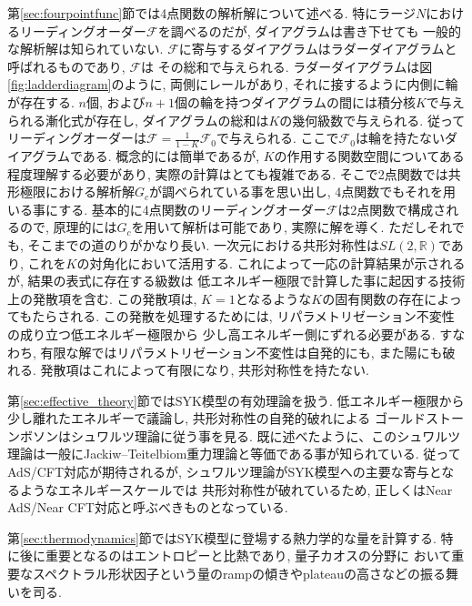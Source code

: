 第\ref{sec:fourpointfunc}節では4点関数の解析解について述べる. 
特にラージ$N$におけるリーディングオーダー$\mathcal{F}$を調べるのだが, ダイアグラムは書き下せても
一般的な解析解は知られていない. 
$\mathcal{F}$に寄与するダイアグラムはラダーダイアグラムと呼ばれるものであり, $\mathcal{F}$は
その総和で与えられる. 
ラダーダイアグラムは図\ref{fig:ladderdiagram}のように, 両側にレールがあり, 
それに接するように内側に輪が存在する. 
$n$個, および$n+1$個の輪を持つダイアグラムの間には積分核$K$で与えられる漸化式が存在し, 
ダイアグラムの総和は$K$の幾何級数で与えられる. 
従ってリーディングオーダーは$\mathcal{F} = \frac{1}{1-K}\mathcal{F}_0$で与えられる. 
ここで$\mathcal{F}_0$は輪を持たないダイアグラムである. 
概念的には簡単であるが, $K$の作用する関数空間についてある程度理解する必要があり, 
実際の計算はとても複雑である. 
そこで2点関数では共形極限における解析解$G_c$が調べられている事を思い出し, 
4点関数でもそれを用いる事にする. 
基本的に4点関数のリーディングオーダー$\mathcal{F}$は2点関数で構成されるので, 
原理的には$G_c$を用いて解析は可能であり, 実際に解を導く. 
ただしそれでも, そこまでの道のりがかなり長い. 
一次元における共形対称性は$SL(2, \mathbb{R})$であり, これを$K$の対角化において活用する. 
これによって一応の計算結果が示されるが, 結果の表式に存在する級数は
低エネルギー極限で計算した事に起因する技術上の発散項を含む. 
この発散項は, $K = 1$となるような$K$の固有関数の存在によってもたらされる. 
この発散を処理するためには, リパラメトリゼーション不変性の成り立つ低エネルギー極限から
少し高エネルギー側にずれる必要がある. 
すなわち, 有限な解ではリパラメトリゼーション不変性は自発的にも, また陽にも破れる. 
発散項はこれによって有限になり, 共形対称性を持たない. 

第\ref{sec:effective_theory}節ではSYK模型の有効理論を扱う. 
低エネルギー極限から少し離れたエネルギーで議論し, 共形対称性の自発的破れによる
ゴールドストーンボソンはシュワルツ理論に従う事を見る. 
既に述べたように、このシュワルツ理論は一般にJackiw--Teitelbiom重力理論と等価である事が知られている. 
従ってAdS/CFT対応が期待されるが, シュワルツ理論がSYK模型への主要な寄与となるようなエネルギースケールでは
共形対称性が破れているため, 正しくはNear AdS/Near CFT対応と呼ぶべきものとなっている. 

第\ref{sec:thermodynamics}節ではSYK模型に登場する熱力学的な量を計算する. 
特に後に重要となるのはエントロピーと比熱であり, 量子カオスの分野に
おいて重要なスペクトラル形状因子という量のrampの傾きやplateauの高さなどの振る舞いを司る. 

